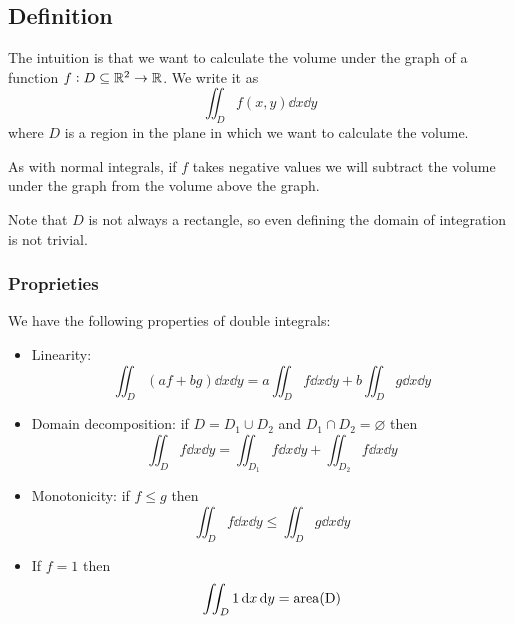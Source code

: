 \documentclass[14pt]{extarticle}
\begin{document}
\subsection{Definition}

The intuition is that we want to calculate the volume under the graph of a function $f: D \subseteq \mathbb{R}^2 \to \mathbb{R}$.
We write it as
\begin{equation}
    \iint_D f(x, y) \dd{x} \dd{y}
\end{equation}
where $D$ is a region in the plane in which we want to calculate the volume.

As with normal integrals, if $f$ takes negative values we will subtract the volume under the graph from the volume above the graph.

Note that $D$ is not always a rectangle, so even defining the domain of integration is not trivial.

\subsubsection{Proprieties}

We have the following properties of double integrals:

\begin{itemize}
    \item Linearity:
          \begin{equation}
              \iint_D (af + bg) \dd{x} \dd{y} = a \iint_D f \dd{x} \dd{y} + b \iint_D g \dd{x} \dd{y}
          \end{equation}
    \item Domain decomposition: if $D = D_1 \cup D_2$ and $D_1 \cap D_2 = \varnothing$ then
          \begin{equation}
              \iint_D f \dd{x} \dd{y} = \iint_{D_1} f \dd{x} \dd{y} + \iint_{D_2} f \dd{x} \dd{y}
          \end{equation}
    \item Monotonicity: if $f \leq g$ then
          \begin{equation}
              \iint_D f \dd{x} \dd{y} \leq \iint_D g \dd{x} \dd{y}
          \end{equation}
    \item If $f = 1$ then
          \begin{equation}
              \iint_D 1 \dd{x} \dd{y} = \operatorfont{area}(D)
          \end{equation}
\end{itemize}
\end{document}
